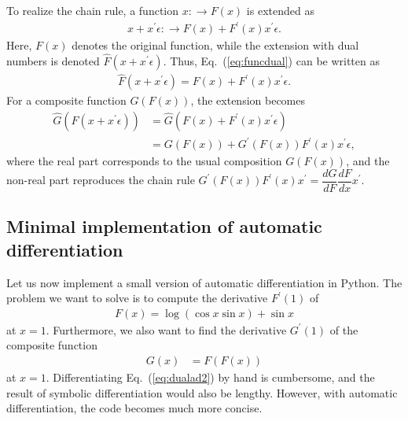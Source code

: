 To realize the chain rule, a function $x:\to F(x)$ is extended as
\begin{align}
\label{eq:funcdual}
x+x^\prime \epsilon: \to F(x) + F^\prime(x) x^\prime \epsilon .
\end{align}
Here, $F(x)$ denotes the original function, while the extension with dual numbers is denoted $\hat{F}(x+x^\prime \epsilon)$. Thus, Eq.~(\ref{eq:funcdual}) can be written as
\begin{align}
\label{eq:chain_ad}
\hat{F}(x+x^\prime \epsilon) = F(x) + F^\prime(x) x^\prime \epsilon .
\end{align}
For a composite function $G(F(x))$, the extension becomes
\begin{align}
\hat{G}(\hat{F}(x+x^\prime \epsilon)) &= \hat{G}(F(x) + F^\prime(x) x^\prime \epsilon) \\
&= G(F(x)) + G^\prime(F(x)) F^\prime(x) x^\prime \epsilon ,
\end{align}
where the real part corresponds to the usual composition $G(F(x))$, and the non-real part reproduces the chain rule $G^\prime(F(x)) F^\prime(x) x^\prime = \dfrac{d G}{d F} \dfrac{d F}{d x} x^\prime$. \\


\subsection*{Minimal implementation of automatic differentiation}

Let us now implement a small version of automatic differentiation in Python. The problem we want to solve is to compute the derivative $F^\prime(1)$ of
\begin{align}
\label{eq:sample_func}
F(x) = \log{(\cos{x} \sin{x})} + \sin{x}
\end{align}
at $x=1$. Furthermore, we also want to find the derivative $G^\prime(1)$ of the composite function
\begin{align}
\label{eq:dualad2}
G(x) &= F(F(x))
\end{align}
at $x=1$. Differentiating Eq.~(\ref{eq:dualad2}) by hand is cumbersome, and the result of symbolic differentiation would also be lengthy. However, with automatic differentiation, the code becomes much more concise.


